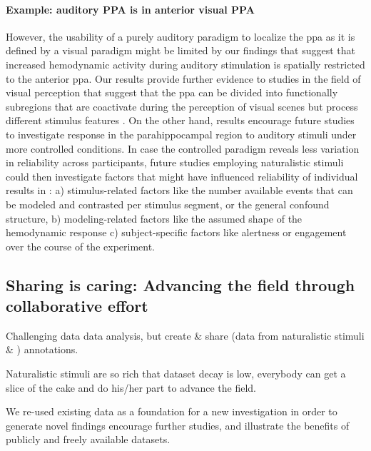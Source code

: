 \paragraph{Example: auditory PPA is in anterior visual PPA}



%
However, the usability of a purely auditory paradigm to localize the \ac{ppa} as
it is defined by a visual paradigm might be limited by our findings that suggest
that increased hemodynamic activity during auditory stimulation is spatially
restricted to the anterior \ac{ppa}.
%
Our results provide further evidence to studies in the field of
visual perception that suggest that the \ac{ppa} can be divided into
functionally subregions that are coactivate during the perception of visual
scenes but process different stimulus features
\citep{aminoff2007parahippocampal, baldassano2013differential}.
%
On the other hand, results encourage future studies to investigate response in
the parahippocampal region to auditory stimuli under more controlled conditions.
%
In case the controlled paradigm reveals less variation in reliability across
participants, future studies employing naturalistic stimuli could then
investigate factors that might have influenced reliability of individual results
in \citet{haeusler2022processing}:
%
a) stimulus-related factors like the number available events that can be modeled
and contrasted per stimulus segment, or the general confound structure,
%
b) modeling-related factors like the assumed shape of the hemodynamic response
%
c) subject-specific factors like alertness or engagement over the course of the
experiment.


\subsection{Sharing is caring: Advancing the field through collaborative effort}

%
Challenging data data analysis, but create \& share (data from naturalistic
stimuli \& ) annotations.

%
Naturalistic stimuli are so rich that dataset decay is low, everybody can get
a slice of the cake and do his/her part to advance the field.

%
We re-used existing data as a foundation for a new investigation in order to
generate novel findings encourage further studies, and illustrate the benefits
of publicly and freely available datasets.

